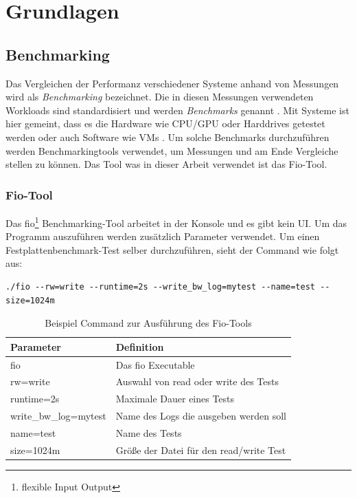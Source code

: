 \chapter{Grundlagen}
\label{cha:Grundlagen}


\section{Benchmarking}

Das Vergleichen der Performanz verschiedener Systeme anhand von Messungen wird als \textit{Benchmarking} bezeichnet. 
Die in diesen Messungen verwendeten Workloads sind standardisiert und werden \textit{Benchmarks} genannt \cite{defi_benchmarking}.
Mit Systeme ist hier gemeint, dass es die Hardware wie CPU/GPU \cite{wang2019benchmarkingtpugpucpu} oder Harddrives \cite{ssd_benchmark} getestet werden oder auch Software 
wie VMs \cite{statistically_rigorous}. Um solche Benchmarks durchzuführen werden Benchmarkingtools verwendet, um Messungen und am Ende Vergleiche stellen zu können.
Das Tool was in dieser Arbeit verwendet ist das Fio-Tool.

\subsection{Fio-Tool}
Das fio\footnote{flexible Input Output} \cite{axboe} Benchmarking-Tool arbeitet in der Konsole und es gibt kein UI.
Um das Programm auszuführen werden zusätzlich Parameter verwendet.
Um einen Festplattenbenchmark-Test selber durchzuführen, sieht der Command wie folgt aus:

\begin{lstlisting}[caption=Beispiel für eine Ausführung eines fio-jobs, label={lst:job}]
  ./fio --rw=write --runtime=2s --write_bw_log=mytest --name=test --size=1024m
\end{lstlisting}


\begin{center}
  \begin{table}[h!]
    \begin{tabularx}{\textwidth}{|X|X|}
      \hline
        \textbf{Parameter}& \textbf{Definition} \\ 
      \hline
      fio & Das fio Executable  \\ 
      \hline
      rw=write & Auswahl von read oder write des Tests  \\ 
      \hline
      runtime=2s & Maximale Dauer eines Tests  \\ 
      \hline
      write\_bw\_log=mytest &  Name des Logs die ausgeben werden soll   \\ 
      \hline
      name=test &  Name des Tests   \\ 
      \hline
      size=1024m & Größe der Datei für den read/write Test    \\ 
      \hline
    \end{tabularx}
    \caption{Beispiel Command zur Ausführung des Fio-Tools}
    \label{tab:1d_1_sta}
  \end{table}
\end{center}

